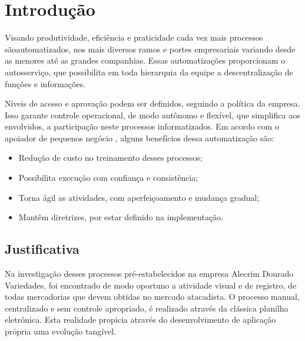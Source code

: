 \documentclass[
	12pt,
	openright,
	oneside, %
	a4paper,
	chapter=TITLE,
	section=TITLE,
	english,
	brazil %
	]{abntex2-udesc}
\begin{document}


\tableofcontents*
\cleardoublepage

\textual
\pagestyle{simple}

\chapter{Introdução}

Visando produtividade, eficiência e praticidade cada vez mais processos sãoautomatizados, nos mais diversos ramos e portes empresariais variando desde as menores até as grandes companhias. Essas automatizações proporcionam o autosserviço, que possibilita em toda hierarquia da equipe a descentralização de funções e informações.

Níveis de acesso e aprovação podem ser definidos, seguindo a política da empresa. Isso garante controle operacional, de modo autônomo e flexível, que simplifica aos envolvidos, a participação neste processos informatizados. Em acordo com o apoiador de pequenos negócio , alguns benefícios dessa automatização são:

\begin{itemize}
\item Redução de custo no treinamento desses processos;
\item Possibilita execução com confiança e consistência;
\item Torna ágil as atividades, com aperfeiçoamento e mudança gradual;
\item Mantêm diretrizes, por estar definido na implementação.
\end{itemize}

\section{Justificativa}

Na investigação desses processos pré-estabelecidos na empresa Alecrim Dourado Variedades, foi encontrado de modo oportuno a atividade visual e de registro, de todas mercadorias que devem obtidas no mercado atacadista. O processo manual, centralizado e sem controle apropriado, é realizado através da clássica planilha eletrônica. Esta realidade propicia através do desenvolvimento de aplicação própria uma evolução tangível.
\end{document}
